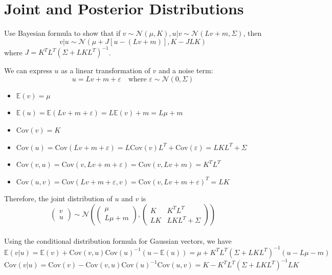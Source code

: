 \documentclass[12pt,a4paper]{article}
\begin{document}
\section{Joint and Posterior Distributions}

Use Bayesian formula to show that if $v \sim \mathcal{N}(\mu, K), u|v \sim \mathcal{N}(Lv + m, \Sigma)$, then
$$
v|u \sim \mathcal{N}(\mu + J\left[u - (Lv + m)\right], K - JLK)
$$
where $J = K^TL^T(\Sigma + LKL^T)^{-1}$. \\

\color{blue}

We can express $u$ as a linear transformation of $v$ and a noise term:
$$
u = Lv + m + \varepsilon \quad \text{where } \varepsilon \sim \mathcal{N}(0, \Sigma)
$$
\begin{itemize}
    \item $\mathbb{E}(v) = \mu$
    \item $\mathbb{E}(u) = \mathbb{E}(Lv + m + \varepsilon) = L\mathbb{E}(v) + m = L\mu + m$
    \item $\text{Cov}(v) = K$
    \item $\text{Cov}(u) = \text{Cov}(Lv + m + \varepsilon) = L\text{Cov}(v)L^T + \text{Cov}(\varepsilon) = LKL^T + \Sigma$
    \item $\text{Cov}(v, u) = \text{Cov}(v, Lv + m + \varepsilon) = \text{Cov}(v, Lv + m) = K^TL^T$
    \item $\text{Cov}(u, v) = \text{Cov}(Lv + m + \varepsilon, v) = \text{Cov}(v, Lv + m + \varepsilon)^T = LK$
\end{itemize}

Therefore, the joint distribution of $u$ and $v$ is
$$
\begin{pmatrix}
    v \\
    u
\end{pmatrix}
\sim \mathcal{N}\left(
\begin{pmatrix}
    \mu \\
    L\mu + m
\end{pmatrix},
\begin{pmatrix}
    K & K^TL^T \\
    LK & LKL^T + \Sigma
\end{pmatrix}
\right)
$$\\

Using the conditional distribution formula for Gaussian vectors, we have
$$
\mathbb{E}(v|u) = \mathbb{E}(v) + \text{Cov}(v, u)\text{Cov}(u)^{-1}(u - \mathbb{E}(u)) = \mu + K^TL^T(\Sigma + LKL^T)^{-1}(u - L\mu - m)
$$
$$
\text{Cov}(v|u) = \text{Cov}(v) - \text{Cov}(v, u)\text{Cov}(u)^{-1}\text{Cov}(u, v) = K - K^TL^T(\Sigma + LKL^T)^{-1}LK
$$\\
\end{document}
